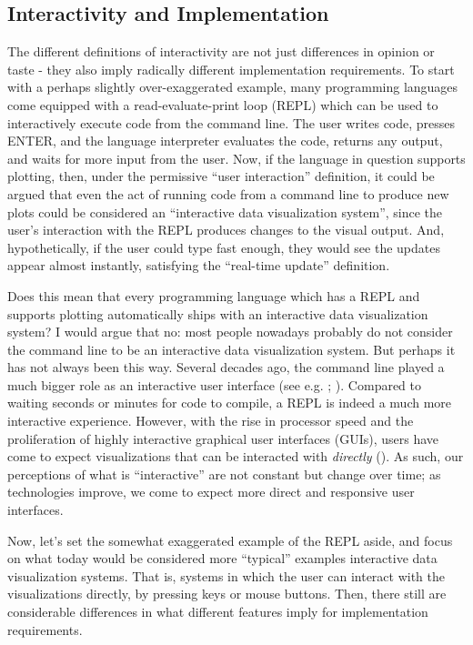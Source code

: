 \documentclass[
]{book}
\theoremstyle{definition}
\theoremstyle{definition}
\theoremstyle{definition}
\theoremstyle{definition}
\theoremstyle{remark}
\begin{document}
\subsection{Interactivity and Implementation}\label{interactivity-and-implementation}

The different definitions of interactivity are not just differences in opinion or taste - they also imply radically different implementation requirements. To start with a perhaps slightly over-exaggerated example, many programming languages come equipped with a read-evaluate-print loop (REPL) which can be used to interactively execute code from the command line. The user writes code, presses ENTER, and the language interpreter evaluates the code, returns any output, and waits for more input from the user. Now, if the language in question supports plotting, then, under the permissive ``user interaction'' definition, it could be argued that even the act of running code from a command line to produce new plots could be considered an ``interactive data visualization system'', since the user's interaction with the REPL produces changes to the visual output. And, hypothetically, if the user could type fast enough, they would see the updates appear almost instantly, satisfying the ``real-time update'' definition.

Does this mean that every programming language which has a REPL and supports plotting automatically ships with an interactive data visualization system? I would argue that no: most people nowadays probably do not consider the command line to be an interactive data visualization system. But perhaps it has not always been this way. Several decades ago, the command line played a much bigger role as an interactive user interface (see e.g. ; ). Compared to waiting seconds or minutes for code to compile, a REPL is indeed a much more interactive experience. However, with the rise in processor speed and the proliferation of highly interactive graphical user interfaces (GUIs), users have come to expect visualizations that can be interacted with \emph{directly} (). As such, our perceptions of what is ``interactive'' are not constant but change over time; as technologies improve, we come to expect more direct and responsive user interfaces.

Now, let's set the somewhat exaggerated example of the REPL aside, and focus on what today would be considered more ``typical'' examples interactive data visualization systems. That is, systems in which the user can interact with the visualizations directly, by pressing keys or mouse buttons. Then, there still are considerable differences in what different features imply for implementation requirements.
\end{document}
